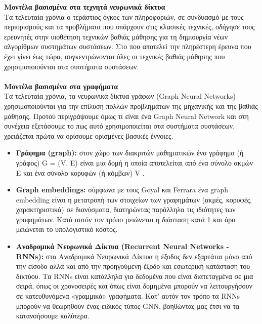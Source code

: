 \noindent \textbf{Μοντέλα βασισμένα στα τεχνητά νευρωνικά δίκτυα}\\
 Τα τελευταία χρόνια ο τεράστιος όγκος των πληροφοριών, σε συνδυασμό με τους περιορισμούς και τα προβλήματα που υπάρχουν στις κλασικές τεχνικές, οδήγησε τους ερευνητές στην υιοθέτηση τεχνικών βαθιάς μάθησης για τη δημιουργία νέων αλγορίθμων συστημάτων συστάσεων. Στο \cite{zhangDeepLearningBased2019} που αποτελεί την πληρέστερη έρευνα που έχει γίνει έως τώρα, συγκεντρώνονται όλες οι τεχνικές βαθιάς μάθησης που χρησιμοποιούνται στα συστήματα συστάσεων. \\\\
\textbf{Μοντέλα βασισμένα στα γραφήματα}\\
Τα τελευταία χρόνια, τα νευρωνικά δίκτυα γράφων (Graph Neural Networks) χρησιμοποιούνται για την επίλυση πολλών προβλημάτων της μηχανικής και της βαθιάς μάθησης. Προτού περιγράψουμε όμως τι είναι ένα Graph Νeural Νetwork και στη συνέχεια εξετάσουμε το πως αυτό χρησιμοποιείται στα συστήματα συστάσεων, χρειάζεται πρώτα να ορίσουμε ορισμένες βασικές έννοιες.
\begin{itemize}
\item \textbf{Γράφημα (graph):} στον χώρο των διακριτών μαθηματικών ένα γράφημα (ή γράφος) G = (V, E) είναι μια δομή η οποία αποτελείται από ένα σύνολο ακμών E και ένα σύνολο κορυφών (ή κόμβων) V \cite{rosenDiscreteMathematicsIts2002}.
\item \textbf{Graph embeddings:} σύμφωνα με τους Goyal και Ferrara \cite{goyalGraphEmbeddingTechniques2018} ένα graph embedding είναι η μετατροπή των στοιχείων των γραφημάτων (ακμές, κορυφές, χαρακτηριστικά) σε διανύσματα, διατηρώντας παράλληλα τις ιδιότητες των γραφημάτων. Κατά αυτόν τον τρόπο μειώνεται η διάσταση κατά 1 και άρα μειώνεται το υπολογιστικό κόστος.
\item\textbf{Αναδρομικά Νευρωνικά Δίκτυα (Recurrent Neural Networks - RNNs):} στα Αναδρομικά  Νευρωνικά Δίκτυα \cite{rumelhartLearningRepresentationsBackpropagating1986} η έξοδος δεν εξαρτάται μόνο από την είσοδο αλλά και από την προηγούμενη έξοδο και εσωτερική κατάσταση του δικτύου. Τα RNNs είναι κατάλληλα για δεδομένα που είναι διατεταγμένα σε μια σειρά, όπως οι χρονοσειρές και όπως είναι δομημένα μπορούν να λειτουργήσουν σε κατευθυνόμενα «γραμμικά» γραφήματα. Κατ' αυτόν τον τρόπο τα RNNs μπορούν να θεωρηθούν ένας ειδικός τύπος GNN, βοηθώντας μας έτσι να τα κατανοήσουμε καλύτερα.
\end{itemize}
